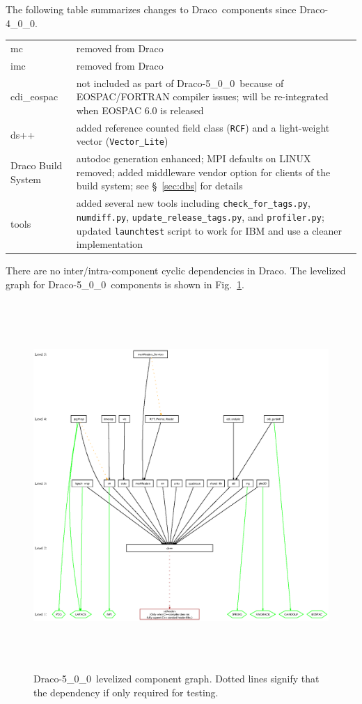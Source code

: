 \documentclass[note]{ResearchNote}
\newcommand{\draco}{Draco}
\newcommand{\dracor}{\draco-5\_0\_0}
\newcommand{\tableText}[1]{{\raggedright #1}}
\begin{document}
The following table summarizes changes to \draco\ components since
\draco-4\_0\_0. 
\begin{center}
  \begin{tabular}{lp{4.0in}}
    \hline\hline 

    mc & \tableText{removed from \draco} \\
    imc & \tableText{removed from \draco} \\
    cdi\_eospac & \tableText{not included as part of \dracor\ because
      of EOSPAC/FORTRAN compiler issues; will be re-integrated when
      EOSPAC 6.0 is released} \\
    ds++ & \tableText{added reference counted field class
      (\texttt{RCF}) and a light-weight vector
      (\texttt{Vector\_Lite})} \\ 
    Draco Build System & \tableText{autodoc generation enhanced; MPI
      defaults on LINUX removed; added middleware vendor option for
      clients of the build system; see \S~\ref{sec:dbs} for details} \\
    tools & \tableText{added several new tools including
      \texttt{check\_for\_tags.py}, \texttt{numdiff.py},
      \texttt{update\_release\_tags.py}, and \texttt{profiler.py};
      updated \texttt{launchtest} script to work for IBM and use a
      cleaner implementation} \\
    \hline\hline 
  \end{tabular}
\end{center}

There are no inter/intra-component cyclic dependencies in \draco.  The
levelized graph for \dracor\ components is shown in
Fig.~\ref{fig:level}.
\begin{figure}
  \label{fig:level}
  \centerline{
    \includegraphics[height=5.5in]{level-5_0_0.ps}}
  \caption{\dracor\ levelized component graph.  Dotted lines signify
    that the dependency if only required for testing.}
\end{figure}
\end{document}
